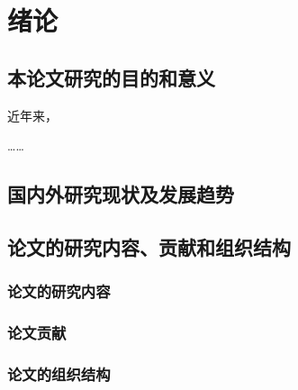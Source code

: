 \chapter{绪论}
\section{本论文研究的目的和意义}

近年来，

……

\section{国内外研究现状及发展趋势}

\section{论文的研究内容、贡献和组织结构}
\subsection{论文的研究内容}
\subsection{论文贡献}
\subsection{论文的组织结构}